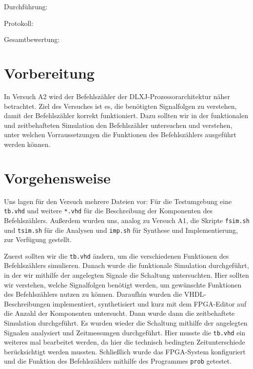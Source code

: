 \documentclass[12pt,a4paper]{scrartcl}
\begin{document}
Durchf\"uhrung:

Protokoll:

Gesamtbewertung:
\clearpage



\section{Vorbereitung}
In Versuch A2 wird der Befehlsz\"ahler der DLXJ-Prozessorarchitektur n\"aher betrachtet.
Ziel des Versuches ist es, die ben\"otigten Signalfolgen zu verstehen, damit der Befehlsz\"ahler korrekt funktioniert.
Dazu sollten wir in der funktionalen und zeitbehafteten Simulation den Befehlsz\"ahler untersuchen und verstehen, unter welchen Vorraussetzungen
die Funktionen des Befehlsz\"ahlers ausgef\"uhrt werden k\"onnen.

\section{Vorgehensweise}

Uns lagen f\"ur den Versuch mehrere Dateien vor: F\"ur die Testumgebung eine \texttt{tb.vhd} und weitere \texttt{*.vhd} f\"ur die Beschreibung der Komponenten des Befehlsz\"ahlers. Au\ss erdem wurden uns, analog zu Versuch A1, die Skripte \texttt{fsim.sh} und \texttt{tsim.sh} f\"ur die Analysen und \texttt{imp.sh} f\"ur Synthese und Implementierung, zur Verf\"ugung gestellt.

Zuerst sollten wir die \texttt{tb.vhd} \"andern, um die verschiedenen Funktionen des Befehlsz\"ahlers simulieren. Danach wurde die funktionale Simulation durchgef\"uhrt, in der wir mithilfe der angelegten Signale die Schaltung untersuchten. Hier sollten wir verstehen, welche Signalfolgen ben\"otigt werden, um gew\"unschte Funktionen des Befehlsz\"ahlers nutzen zu k\"onnen. Daraufhin wurden die VHDL-Beschreibungen implementiert, synthetisiert und kurz mit dem FPGA-Editor auf die Anzahl der Komponenten untersucht. Dann wurde dann die zeitbehaftete Simulation durchgef\"uhrt. Es wurden wieder die Schaltung mithilfe der angelegten Signalen analysiert und Zeitmessungen durchgef\"uhrt. Hier musste die \texttt{tb.vhd} ein weiteres mal bearbeitet werden, da hier die technisch bedingten Zeitunterschiede ber\"ucksichtigt werden mussten. Schlie\ss lich wurde das FPGA-System konfiguriert und die Funktion des Befehlsz\"ahlers mithilfe des Programmes \texttt{prob} getestet.


\newpage
\end{document}
